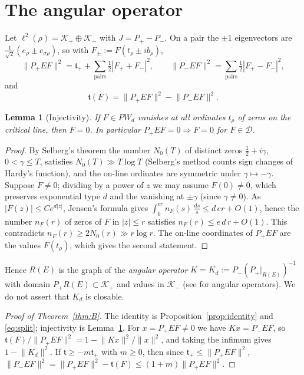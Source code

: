\documentclass[11pt]{amsart}
\newtheorem{lemma}[theorem]{Lemma}
\theoremstyle{definition}
\theoremstyle{remark}
\newcommand{\half}{\tfrac12}
\newcommand{\PW}{\mathit{PW}_d}
\newcommand{\tform}{\mathfrak t}
\newcommand{\tplus}{\mathfrak t_+}
\newcommand{\Kop}{K}
\newcommand{\Norm}[1]{\lVert #1 \rVert}
\begin{document}
\section{The angular operator}\label{sec:angular}

Let $\ell^{2}(\rho)=\mathcal K_+\oplus\mathcal K_-$ with $J=P_+-P_-$. On a pair the $\pm1$
eigenvectors are $\tfrac1{\sqrt2}(e_\rho\pm e_{\sigma\rho})$, so with
$F_\pm:=F(t_\rho\pm ib_\rho)$,
\[
\Norm{P_+EF}^{2}=\tplus+\!\!\sum_{\text{pairs}}\tfrac12|F_++F_-|^{2},\qquad
\Norm{P_-EF}^{2}=\!\!\sum_{\text{pairs}}\tfrac12|F_+-F_-|^{2},
\]
and
\begin{equation}\label{eq:split}
\tform(F)=\Norm{P_+EF}^{2}-\Norm{P_-EF}^{2}.
\end{equation}

\begin{lemma}[Injectivity]\label{lem:inj}
If $F\in\PW$ vanishes at all ordinates $t_\rho$ of zeros on the critical line, then $F=0$.
In particular $P_+EF=0\Rightarrow F=0$ for $F\in\mathcal D$.
\end{lemma}
\begin{proof}
By Selberg's theorem \cite{Selberg1942} the number $N_0(T)$ of distinct zeros
$\half+i\gamma$, $0<\gamma\le T$, satisfies $N_0(T)\gg T\log T$ (Selberg's method counts
sign changes of Hardy's function), and the on-line ordinates are symmetric
under $\gamma\mapsto-\gamma$. Suppose $F\ne0$; dividing by a power of $z$ we may assume
$F(0)\ne0$, which preserves exponential type $d$ and the vanishing at $\pm\gamma$ (since
$\gamma\ne0$). As $|F(z)|\le C e^{d|z|}$, Jensen's formula gives
$\int_0^{er}n_F(s)\,\tfrac{ds}{s}\le d\,er+O(1)$, hence the number $n_F(r)$ of zeros of
$F$ in $|z|\le r$ satisfies $n_F(r)\le e\,d\,r+O(1)$. This contradicts $n_F(r)\ge 2N_0(r)\gg
r\log r$. The on-line coordinates of $P_+EF$ are the values $F(t_\rho)$, which gives the
second statement.
\end{proof}

Hence $R(E)$ is the graph of the \emph{angular operator}
$\Kop=\Kop_d:=P_-(P_+|_{R(E)})^{-1}$ with domain $P_+R(E)\subset\mathcal K_+$ and values in
$\mathcal K_-$ (see \cite[Ch.~1, \S8]{AzizovIokhvidov} for angular operators). We do not
assert that $\Kop_d$ is closable.

\begin{proof}[Proof of Theorem~\ref{thm:B}]
The identity is Proposition~\ref{prop:identity} and \eqref{eq:split}; injectivity is
Lemma~\ref{lem:inj}. For $x=P_+EF\ne0$ we have $\Kop x=P_-EF$, so
$\tform(F)/\Norm{P_+EF}^{2}=1-\Norm{\Kop x}^{2}/\Norm{x}^{2}$, and taking the infimum gives
$1-\Norm{\Kop_d}^{2}$. If $\tform\ge-m\tplus$ with $m\ge0$, then since $\tplus\le\Norm{P_+EF}^{2}$,
$\Norm{P_-EF}^{2}=\Norm{P_+EF}^{2}-\tform(F)\le(1+m)\Norm{P_+EF}^{2}$.
\end{proof}
\end{document}
